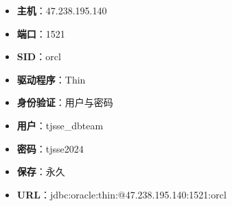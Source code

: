 \begin{itemize}
	\item \textbf{主机}：47.238.195.140
	\item \textbf{端口}：1521
	\item \textbf{SID}：orcl
	\item \textbf{驱动程序}：Thin
	\item \textbf{身份验证}：用户与密码
	\item \textbf{用户}：tjsse\_dbteam
	\item \textbf{密码}：tjsse2024
	\item \textbf{保存}：永久
	\item \textbf{URL}：jdbc:oracle:thin:@47.238.195.140:1521:orcl
\end{itemize}